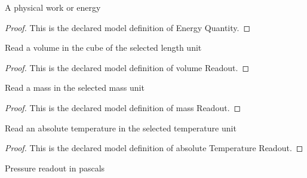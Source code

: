 \begin{definition}
  \label{def:physics:phyx-mini-0461:phyxminiproblems-problemphyxmini0461-energyquantity}
  A physical work or energy
\end{definition}
\begin{proof}
  This is the declared model definition of Energy Quantity.
\end{proof}
\begin{definition}
  \label{def:physics:phyx-mini-0461:phyxminiproblems-problemphyxmini0461-volumereadout}
  Read a volume in the cube of the selected length unit
\end{definition}
\begin{proof}
  This is the declared model definition of volume Readout.
\end{proof}
\begin{definition}
  \label{def:physics:phyx-mini-0461:phyxminiproblems-problemphyxmini0461-massreadout}
  Read a mass in the selected mass unit
\end{definition}
\begin{proof}
  This is the declared model definition of mass Readout.
\end{proof}
\begin{definition}
  \label{def:physics:phyx-mini-0461:phyxminiproblems-problemphyxmini0461-absolutetemperaturereadout}
  Read an absolute temperature in the selected temperature unit
\end{definition}
\begin{proof}
  This is the declared model definition of absolute Temperature Readout.
\end{proof}
\begin{definition}
  \label{def:physics:phyx-mini-0461:phyxminiproblems-problemphyxmini0461-pressureinpascals}
  Pressure readout in pascals
\end{definition}
